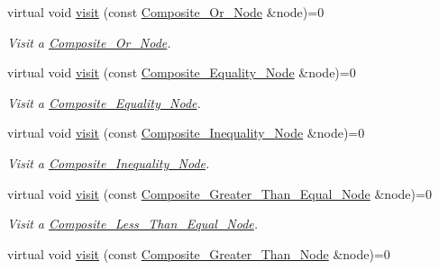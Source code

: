 \begin{DoxyCompactItemize}
virtual void \hyperlink{classMadara_1_1Expression__Tree_1_1Visitor_a1d77ed3780e25fd736ac5adf3053ff3c}{visit} (const \hyperlink{classMadara_1_1Expression__Tree_1_1Composite__Or__Node}{Composite\_\-Or\_\-Node} \&node)=0
\begin{DoxyCompactList}\small\item\em Visit a \hyperlink{classMadara_1_1Expression__Tree_1_1Composite__Or__Node}{Composite\_\-Or\_\-Node}. \item\end{DoxyCompactList}\item 
virtual void \hyperlink{classMadara_1_1Expression__Tree_1_1Visitor_a1224cd9f797b16400cf75c76221408fb}{visit} (const \hyperlink{classMadara_1_1Expression__Tree_1_1Composite__Equality__Node}{Composite\_\-Equality\_\-Node} \&node)=0
\begin{DoxyCompactList}\small\item\em Visit a \hyperlink{classMadara_1_1Expression__Tree_1_1Composite__Equality__Node}{Composite\_\-Equality\_\-Node}. \item\end{DoxyCompactList}\item 
virtual void \hyperlink{classMadara_1_1Expression__Tree_1_1Visitor_ac81a4bdef4403e10e8a6d3f156048528}{visit} (const \hyperlink{classMadara_1_1Expression__Tree_1_1Composite__Inequality__Node}{Composite\_\-Inequality\_\-Node} \&node)=0
\begin{DoxyCompactList}\small\item\em Visit a \hyperlink{classMadara_1_1Expression__Tree_1_1Composite__Inequality__Node}{Composite\_\-Inequality\_\-Node}. \item\end{DoxyCompactList}\item 
virtual void \hyperlink{classMadara_1_1Expression__Tree_1_1Visitor_a69644a36999b74dbcc12832decdce966}{visit} (const \hyperlink{classMadara_1_1Expression__Tree_1_1Composite__Greater__Than__Equal__Node}{Composite\_\-Greater\_\-Than\_\-Equal\_\-Node} \&node)=0
\begin{DoxyCompactList}\small\item\em Visit a \hyperlink{classMadara_1_1Expression__Tree_1_1Composite__Less__Than__Equal__Node}{Composite\_\-Less\_\-Than\_\-Equal\_\-Node}. \item\end{DoxyCompactList}\item 
virtual void \hyperlink{classMadara_1_1Expression__Tree_1_1Visitor_a7d9dc0afe2f6c86bf003173f06b82b71}{visit} (const \hyperlink{classMadara_1_1Expression__Tree_1_1Composite__Greater__Than__Node}{Composite\_\-Greater\_\-Than\_\-Node} \&node)=0

\end{DoxyCompactItemize}
